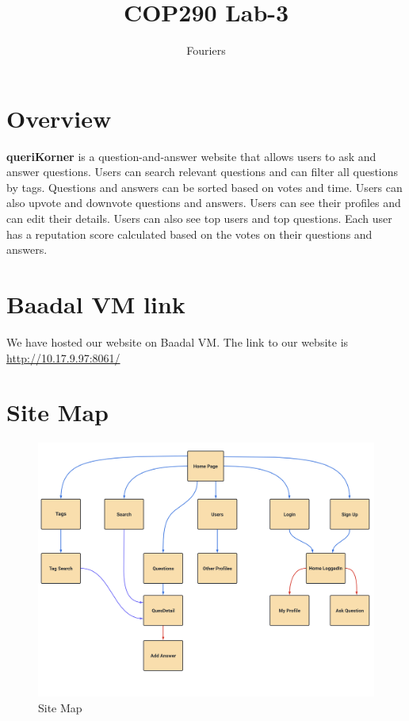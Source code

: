 \documentclass{article}
\title{COP290 Lab-3}
\author{Fouriers}
\date{}
\begin{document}
\maketitle


\section{Overview}
\textbf{queriKorner} is a question-and-answer website that allows users to ask and answer questions.
Users can search relevant questions and can filter all questions by tags.
Questions and answers can be sorted based on votes and time.
Users can also upvote and downvote questions and answers.
Users can see their profiles and can edit their details.
Users can also see top users and top questions.
Each user has a reputation score calculated based on the votes on their questions and answers.
\section{Baadal VM link}

We have hosted our website on Baadal VM. The link to our website is
\href{http://10.17.9.97:8061/}{http://10.17.9.97:8061/}

\section{Site Map}

\begin{figure}[h]
    \centering
    \includegraphics[width=13cm]{sitemap.png}
    \caption[short]{Site Map}
    \end{figure}
\end{document}
